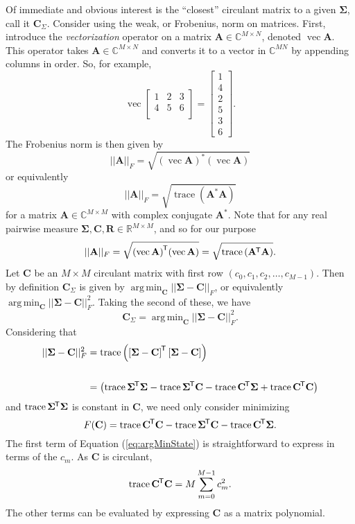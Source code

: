 \documentclass[letterpaper,12pt,oneside,final]{article}
\newcommand{\m}[1]{\mathbf{#1}}               %
\newcommand{\sm}[1]{\boldsymbol{#1}}   %
\newcommand{\tr}[1]{{#1}^{\mkern-1.5mu\mathsf{T}}}              %
\newcommand{\conj}[1]{{#1}^{\ast}}
\newcommand{\norm}[1]{||{#1}||}              %
\newcommand{\frob}[1]{\norm{#1}_F}
\newcommand*{\mvec}{\operatorname{vec}}
\newcommand*{\trace}{\operatorname{trace}}
\DeclareMathOperator*{\argmin}{arg\,min}
\newcommand{\field}[1]{\mathbb{#1}}
\newcommand{\Reals}{\field{R}}
\newcommand{\Complex}{\field{C}}
\begin{document}
Of immediate and obvious interest is the ``closest'' circulant matrix to a given $\sm{\Sigma}$, call it $\m{C}_{\Sigma}$. Consider using the weak, or Frobenius, norm on matrices. First, introduce the \textit{vectorization} operator on a matrix $\m{A} \in \Complex^{M \times N}$, denoted $\mvec{\m{A}}$. This operator takes $\m{A} \in \Complex^{M \times N}$ and converts it to a vector in $\Complex^{MN}$ by appending columns in order. So, for example,
$$\mvec{\begin{bmatrix}
    1 & 2 & 3 \\
    4 & 5 & 6 \\
  \end{bmatrix}} =
\begin{bmatrix}
  1 \\ 4 \\ 2 \\ 5 \\ 3 \\ 6
  \end{bmatrix}.$$
The Frobenius norm is then given by
$$\frob{\m{A}} = \sqrt{\conj{(\mvec{\m{A}})} (\mvec{\m{A}})}$$
or equivalently
$$\frob{\m{A}} = \sqrt{\trace \left ( \conj{\m{A}} \m{A} \right )}$$
for a matrix $\m{A} \in \Complex^{M \times M}$ with complex conjugate $\conj{\m{A}}$. Note that for any real pairwise measure $\sm{\Sigma}, \m{C}, \m{R} \in \Reals^{M \times M}$, and so for our purpose
$$\frob{\m{A}} = \sqrt{\tr{(\mvec{\m{A}})} (\mvec{\m{A}})} = \sqrt{ \trace \left ( \tr{\m{A}} \m{A} \right )}.$$
Let $\m{C}$ be an $M \times M$ circulant matrix with first row $( c_0, c_1, c_2, \dots, c_{M-1} )$. Then by definition $\m{C}_{\Sigma}$ is given by $\argmin_{\m{C}} \frob{\sm{\Sigma} - \m{C}}$, or equivalently $\argmin_{\m{C}} \frob{\sm{\Sigma} - \m{C}}^2$. Taking the second of these, we have
\begin{equation} \label{eq:argMinDef}
  \m{C}_{\Sigma} = \argmin_{\m{C}} \frob{\sm{\Sigma} - \m{C}}^2.
\end{equation}
Considering that
\begin{equation*}
  \begin{split}
    \frob{\sm{\Sigma} - \m{C}}^2 & = \trace \left ( \tr{\left [ \sm{\Sigma} - \m{C} \right ]} \left [ \sm{\Sigma} - \m{C} \right ] \right ) \\
    & \\
    & = \left ( \trace \tr{\sm{\Sigma}} \sm{\Sigma} - \trace \tr{\sm{\Sigma}} \m{C} - \trace \tr{\m{C}} \sm{\Sigma} + \trace \tr{\m{C}} \m{C} \right )
  \end{split}
\end{equation*}
and $\trace \tr{\sm{\Sigma}} \sm{\Sigma}$ is constant in $\m{C}$, we need only consider minimizing
\begin{equation} \label{eq:argMinState}
  F(\m{C}) = \trace \tr{\m{C}} \m{C} - \trace \tr{\sm{\Sigma}} \m{C} - \trace \tr{\m{C}} \sm{\Sigma}.
\end{equation}
The first term of Equation (\ref{eq:argMinState}) is straightforward to express in terms of the $c_m$. As $\m{C}$ is circulant,
$$\trace \tr{\m{C}} \m{C} = M \sum_{m = 0}^{M-1} c_m^2.$$
The other terms can be evaluated by expressing $\m{C}$ as a matrix polynomial.
\end{document}

